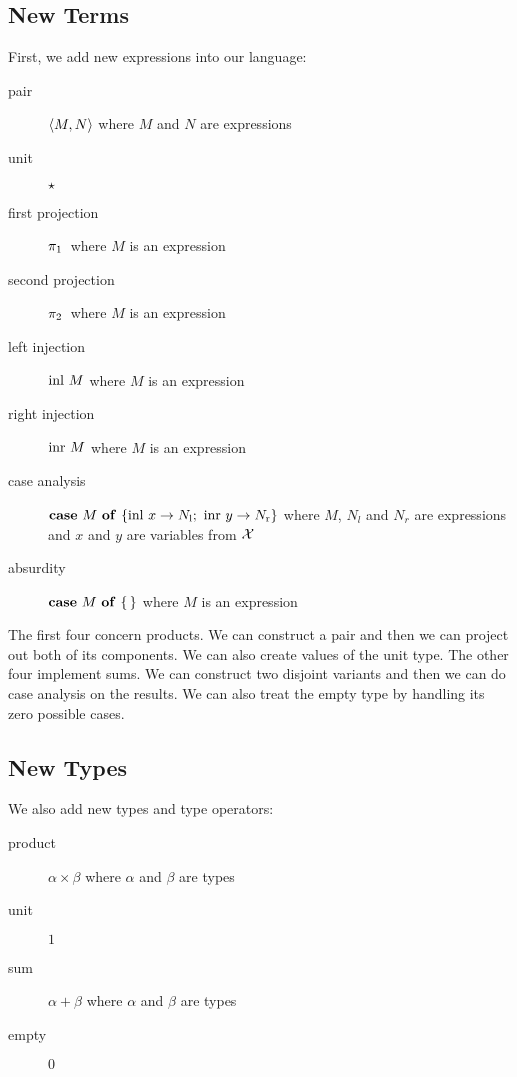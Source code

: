 \subsection{New Terms}

First, we add new expressions into our language:

\begin{description}
  \item[pair] $\left<M, N\right>$ where $M$ and $N$ are expressions
  \item[unit] $\star$
  \item[first projection] $\ap{\pi_1}$ where $M$ is an expression
  \item[second projection] $\ap{\pi_2}$ where $M$ is an expression
  \item[left injection] $\operatorname{inl}\,M$ where $M$ is an expression
  \item[right injection] $\operatorname{inr}\,M$ where $M$ is an expression
  \item[case analysis] \hspace{1mm}
    $\text{\textbf{case} $M$ \textbf{of} $\{ \operatorname{inl}\,x \to N_{\mathrm{l}};\ \operatorname{inr}\,y \to N_{\mathrm{r}} \}$}$ where $M$, $N_l$ and
    $N_r$ are expressions and $x$ and $y$ are variables from $\mathcal{X}$
  \item[absurdity] \hspace{1mm} $\text{\textbf{case} $M$ \textbf{of} \{\,\}}$ where $M$ is an expression
\end{description}

The first four concern products. We can construct a pair and then we can
project out both of its components. We can also create values of the unit
type. The other four implement sums. We can construct two disjoint variants
and then we can do case analysis on the results. We can also treat the
empty type by handling its zero possible cases.

\subsection{New Types}

We also add new types and type operators:

\begin{description}
  \item[product] $\alpha \times \beta$ where $\alpha$ and $\beta$ are types
  \item[unit] $1$
  \item[sum] $\alpha + \beta$ where $\alpha$ and $\beta$ are types
  \item[empty] $0$
\end{description}

